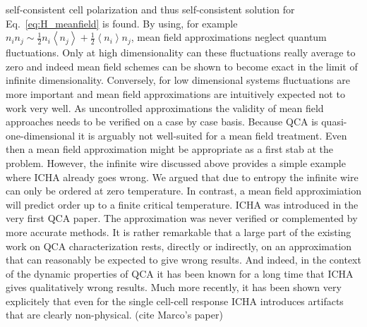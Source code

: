 self-consistent cell polarization and thus self-consistent solution for
Eq.~\eqref{eq:H_meanfield} is found. By using, for example $n_i n_j \sim
\frac{1}{2} n_i \left< n_j \right> + \frac{1}{2} \left< n_i \right> n_j$, mean
field approximations neglect quantum fluctuations. Only at high dimensionality
can these fluctuations really average to zero and indeed mean field schemes can
be shown to become exact in the limit of infinite dimensionality. Conversely,
for low dimensional systems fluctuations are more important and mean field
approximations are intuitively expected not to work very well. As uncontrolled
approximations the validity of mean field approaches needs to be verified on a
case by case basis. Because QCA is quasi-one-dimensional it is arguably not
well-suited for a mean field treatment. Even then a mean field approximation
might be appropriate as a first stab at the problem. However, the infinite wire
discussed above provides a simple example where ICHA already goes wrong. We
argued that due to entropy the infinite wire can only be ordered at zero
temperature. In contrast, a mean field approximiation will predict order up to a
finite critical temperature. ICHA was introduced in the very first QCA paper.
The approximation was never verified or complemented by more accurate methods.
It is rather remarkable that a large part of the existing work on QCA
characterization rests, directly or indirectly, on an approximation that can
reasonably be expected to give wrong results. And indeed, in the context of the
dynamic properties of QCA it has been known for a long time that ICHA gives
qualitatively wrong results. Much more recently, it has been shown very
explicitely that even for the single cell-cell response ICHA introduces
artifacts that are clearly non-physical. (cite Marco's paper)

